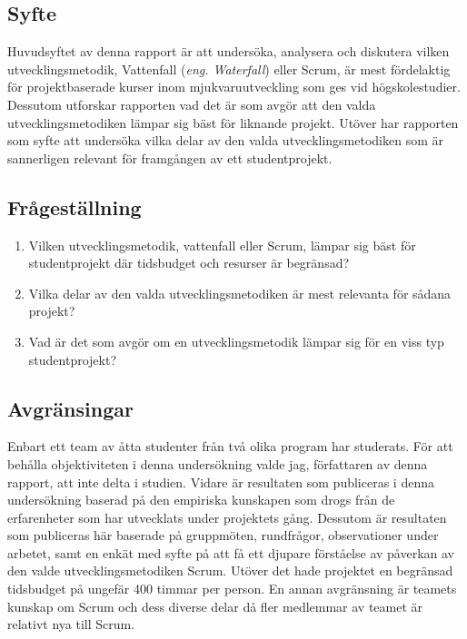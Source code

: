 \subsection{Syfte}
Huvudsyftet av denna rapport är att undersöka, analysera och diskutera vilken utvecklingsmetodik, Vattenfall (\textit{eng. Waterfall}) eller Scrum,
är mest fördelaktig för projektbaserade kurser inom mjukvaruutveckling som ges vid högskolestudier. Dessutom utforskar rapporten vad det är som avgör att den valda utvecklingsmetodiken lämpar sig bäst för liknande projekt. Utöver har rapporten som syfte att undersöka vilka delar av den valda utvecklingsmetodiken som är sannerligen relevant för framgången av ett studentprojekt.

\subsection{Frågeställning}
\label{subsec:Lieth_Wahid-research-questions}

\begin{enumerate}
	
	\item Vilken utvecklingsmetodik, vattenfall eller Scrum, lämpar sig bäst för studentprojekt där tidsbudget och resurser är begränsad? 
	
	\item  Vilka delar av den valda utvecklingsmetodiken är mest relevanta för sådana projekt? 
	
	\item Vad är det som avgör om en utvecklingsmetodik lämpar sig för en viss typ studentprojekt? 
	
\end{enumerate}

\subsection{Avgränsingar}
\label{subsec:Lieth_Wahid-delimitations}
Enbart ett team av åtta studenter från två olika program har studerats. För att behålla objektiviteten i denna undersökning valde jag, författaren av denna rapport, att inte delta i studien. Vidare är resultaten som publiceras i denna undersökning baserad på den empiriska kunskapen som drogs från de erfarenheter som har utvecklats under projektets gång. Dessutom är resultaten som publiceras här baserade på gruppmöten, rundfrågor, observationer under arbetet, samt en enkät med syfte på att få ett djupare förståelse av påverkan av den valde utvecklingsmetodiken Scrum. Utöver det hade projektet en begränsad tidsbudget på ungefär 400 timmar per person. En annan avgränsning är teamets kunskap om Scrum och dess diverse delar då fler medlemmar av teamet är relativt nya till Scrum.



